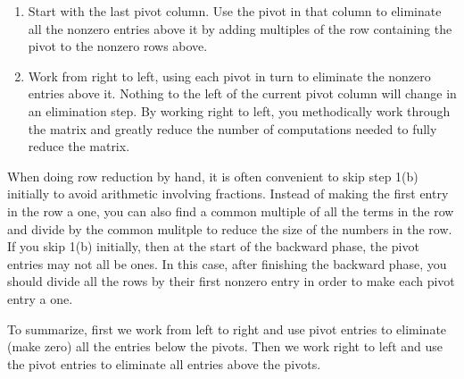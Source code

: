\begin{enumerate}
\begin{enumerate}
	\item Start with the last pivot column.   Use the pivot in that column to eliminate all the nonzero entries above it by adding multiples of the row containing the pivot to the nonzero rows above. 
	\item Work from right to left, using each pivot in turn to eliminate the nonzero entries above it. Nothing to the left of the current pivot column will change in an elimination step.  By working right to left, you methodically work through the matrix and greatly reduce the number of computations needed to fully reduce the matrix.
\end{enumerate}
\end{enumerate}

When doing row reduction by hand, it is often convenient to skip step 1(b) initially to avoid arithmetic involving fractions. Instead of making the first entry in the row a one, you can also find a common multiple of all the terms in the row and divide by the common mulitple to reduce the size of the numbers in the row.  If you skip 1(b) initially, then at the start of the backward phase, the pivot entries may not all be ones.  In this case, after finishing the backward phase, you should divide all the rows by their first nonzero entry in order to make each pivot entry a one.

To summarize, first we work from left to right and use pivot entries to eliminate (make zero) all the entries below the pivots.  Then we work right to left and use the pivot entries to eliminate all entries above the pivots.

